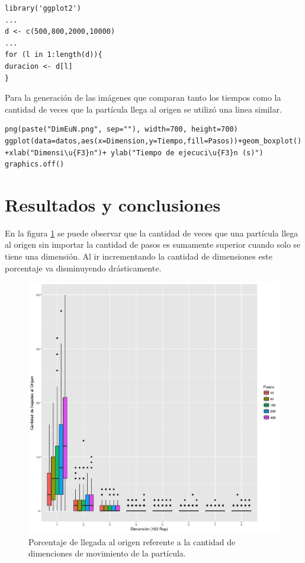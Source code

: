 \documentclass[a4paper]{article}
\begin{document}
\begin{lstlisting}[frame=single]
library('ggplot2')
...
d <- c(500,800,2000,10000)
...
for (l in 1:length(d)){
duracion <- d[l]
}
\end{lstlisting}

Para la generación de las imágenes que comparan tanto los tiempos como la cantidad de veces que la partícula llega al origen se utilizó una linea similar.
\begin{lstlisting}[frame=single]
png(paste("DimEuN.png", sep=""), width=700, height=700)
ggplot(data=datos,aes(x=Dimension,y=Tiempo,fill=Pasos))+geom_boxplot()
+xlab("Dimensi\u{F3}n")+ ylab("Tiempo de ejecuci\u{F3}n (s)")
graphics.off()
\end{lstlisting}

\section{Resultados y conclusiones}
En la figura \ref{fig:PorcentajesEu} se puede observar que la cantidad de veces que una partícula llega al origen sin importar la cantidad de pasos es sumamente superior cuando solo se tiene una dimensión. Al ir incrementando la cantidad de dimensiones este porcentaje va disminuyendo drásticamente.

\begin{figure}[h]
\centering
\includegraphics[width=0.7\linewidth]{PorcentajesEu}
\caption{Porcentaje de llegada al origen referente a la cantidad de dimenciones de movimiento de la partícula.}
\label{fig:PorcentajesEu}
\end{figure}
\end{document}
